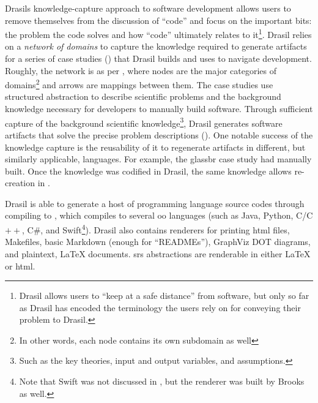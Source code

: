 \roughNetworkOfDomains{}

Drasils knowledge-capture approach to software development allows users to
remove themselves from the discussion of ``code'' and focus on the important
bits: the problem the code solves and how ``code'' ultimately relates to
it\footnote{Drasil allows users to ``keep at a safe distance'' from software,
      but only so far as Drasil has encoded the terminology the users rely on for
      conveying their problem to Drasil.}. Drasil relies on a \textit{network of
      domains} \cite{Czarnecki2005} to capture the knowledge required to generate
artifacts for a series of case studies () that Drasil
builds and uses to navigate development. Roughly, the network is as per
, where nodes are the major categories of
domains\footnote{In other words, each node contains its own subdomain as well}
and arrows are mappings between them. The case studies use structured 
\cite{SmithAndLai2005} abstraction to describe scientific problems and the
background knowledge necessary for developers to manually build software.
Through sufficient capture of the background scientific knowledge\footnote{Such
      as the key theories, input and output variables, and assumptions.}, Drasil
generates software artifacts that solve the precise problem descriptions
(). One notable success of the knowledge capture is
the reusability of it to regenerate artifacts in different, but similarly
applicable, languages. For example, the \acs{glassbr} case study had
manually built. Once the knowledge was codified in Drasil, the same knowledge
allows re-creation in .

\caseStudiesTable{}

Drasil is able to generate a host of  programming language source codes
through compiling to  \cite{MacLachlan2020}, which compiles to several
\acs{oo} languages (such as Java, Python, C/C$++$, C\#, and Swift\footnote{Note
      that Swift was not discussed in \cite{MacLachlan2020}, but the renderer was
      built by Brooks as well.}). Drasil also contains renderers for printing
\acs{html} files, Makefiles, basic Markdown (enough for ``READMEs''), GraphViz
DOT \cite{Gansner1993} diagrams, and plaintext, \LaTeX{} documents. \acs{srs}
abstractions are renderable in either \LaTeX{} or \acs{html}.

